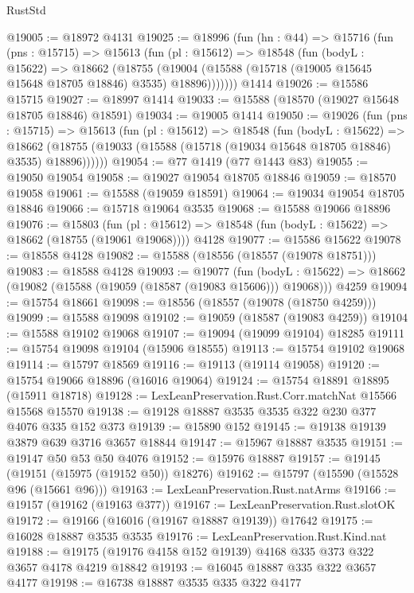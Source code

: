 \begin{lexlean}{RustStd}
\begin{coremodule}
@19005 := @18972 @4131
@19025 := @18996
    (fun (hn : @44) =>
    @15716
      (fun (pns : @15715) =>
      @15613
        (fun (pl : @15612) =>
        @18548
          (fun (bodyL : @15622) =>
          @18662
            (@18755
              (@19004 (@15588 (@15718 (@19005 @15645 @15648 @18705 @18846) @3535) @18896)))))))
    @1414
@19026 := @15586 @15715
@19027 := @18997 @1414
@19033 := @15588 (@18570 (@19027 @15648 @18705 @18846) @18591)
@19034 := @19005 @1414
@19050 := @19026
    (fun (pns : @15715) =>
    @15613
      (fun (pl : @15612) =>
      @18548
        (fun (bodyL : @15622) =>
        @18662 (@18755 (@19033 (@15588 (@15718 (@19034 @15648 @18705 @18846) @3535) @18896))))))
@19054 := @77 @1419 (@77 @1443 @83)
@19055 := @19050 @19054
@19058 := @19027 @19054 @18705 @18846
@19059 := @18570 @19058
@19061 := @15588 (@19059 @18591)
@19064 := @19034 @19054 @18705 @18846
@19066 := @15718 @19064 @3535
@19068 := @15588 @19066 @18896
@19076 := @15803
    (fun (pl : @15612) => @18548 (fun (bodyL : @15622) => @18662 (@18755 (@19061 @19068))))
    @4128
@19077 := @15586 @15622
@19078 := @18558 @4128
@19082 := @15588 (@18556 (@18557 (@19078 @18751)))
@19083 := @18588 @4128
@19093 := @19077
    (fun (bodyL : @15622) => @18662 (@19082 (@15588 (@19059 (@18587 (@19083 @15606))) @19068)))
    @4259
@19094 := @15754 @18661
@19098 := @18556 (@18557 (@19078 (@18750 @4259)))
@19099 := @15588 @19098
@19102 := @19059 (@18587 (@19083 @4259))
@19104 := @15588 @19102 @19068
@19107 := @19094 (@19099 @19104) @18285
@19111 := @15754 @19098 @19104 (@15906 @18555)
@19113 := @15754 @19102 @19068
@19114 := @15797 @18569
@19116 := @19113 (@19114 @19058)
@19120 := @15754 @19066 @18896 (@16016 @19064)
@19124 := @15754 @18891 @18895 (@15911 @18718)
@19128 := LexLeanPreservation.Rust.Corr.matchNat @15566 @15568 @15570
@19138 := @19128 @18887 @3535 @3535 @322 @230 @377 @4076 @335 @152 @373
@19139 := @15890 @152
@19145 := @19138 @19139 @3879 @639 @3716 @3657 @18844
@19147 := @15967 @18887 @3535
@19151 := @19147 @50 @53 @50 @4076
@19152 := @15976 @18887
@19157 := @19145 (@19151 (@15975 (@19152 @50)) @18276)
@19162 := @15797 (@15590 (@15528 @96 (@15661 @96)))
@19163 := LexLeanPreservation.Rust.natArms
@19166 := @19157 (@19162 (@19163 @377))
@19167 := LexLeanPreservation.Rust.slotOK
@19172 := @19166 (@16016 (@19167 @18887 @19139)) @17642
@19175 := @16028 @18887 @3535 @3535
@19176 := LexLeanPreservation.Rust.Kind.nat
@19188 := @19175 (@19176 @4158 @152 @19139) @4168 @335 @373 @322 @3657 @4178 @4219 @18842
@19193 := @16045 @18887 @335 @322 @3657 @4177
@19198 := @16738 @18887 @3535 @335 @322 @4177

\end{coremodule}
\end{lexlean}
